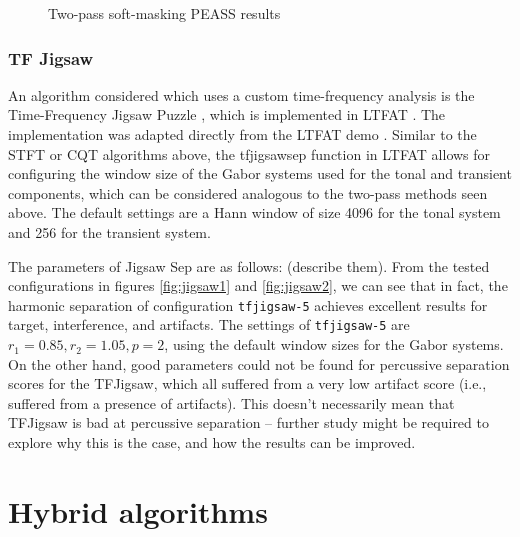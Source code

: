 \documentclass[letter,12pt]{article}
\begin{document}
\begin{figure}
	\centering
	\vspace{-1.25em}
	\caption{Two-pass soft-masking PEASS results}
	\label{fig:vocalround1soft}
\end{figure}

\subsubsection{TF Jigsaw}

An algorithm considered which uses a custom time-frequency analysis is the Time-Frequency Jigsaw Puzzle \cite{tfjigsaw}, which is implemented in LTFAT \cite{tfjigsaw2}. The implementation was adapted directly from the LTFAT demo \cite{tfjigsaw3}. Similar to the STFT or CQT algorithms above, the tfjigsawsep function in LTFAT allows for configuring the window size of the Gabor systems used for the tonal and transient components, which can be considered analogous to the two-pass methods seen above. The default settings are a Hann window of size 4096 for the tonal system and 256 for the transient system.

The parameters of Jigsaw Sep are as follows: (describe them). From the tested configurations in figures \ref{fig:jigsaw1} and \ref{fig:jigsaw2}, we can see that in fact, the harmonic separation of configuration \Verb#tfjigsaw-5# achieves excellent results for target, interference, and artifacts. The settings of \Verb#tfjigsaw-5# are $r_{1} = 0.85, r_{2} = 1.05, p = 2$, using the default window sizes for the Gabor systems. On the other hand, good parameters could not be found for percussive separation scores for the TFJigsaw, which all suffered from a very low artifact score (i.e., suffered from a presence of artifacts). This doesn't necessarily mean that TFJigsaw  is bad at percussive separation -- further study might be required to explore why this is the case, and how the results can be improved.

\vfill
\clearpage %

\section{Hybrid algorithms}
\label{sec:hybrids}

\vfill
\clearpage %

\nocite{*}
\printbibheading[title={References}]
\printbibliography[heading=none]
\end{document}

